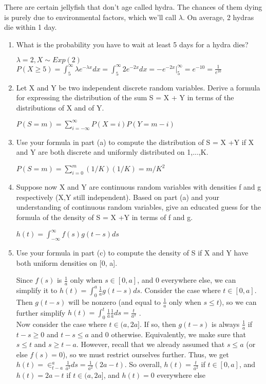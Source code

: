 \question There are certain jellyfish that don’t age called hydra. The 
chances of them dying is purely due to environmental factors, which 
we’ll call $\lambda$. On average, 2 hydras die within 1 day.
\begin{enumerate}[label=(\alph*)]
\item What is the probability you have to wait at least 5 days for a 
hydra dies?
\begin{solution}[2.5cm]
$\lambda = 2, X \sim Exp(2)$ \\
$P(X\geq 5) = \int_5^\infty \lambda e^{-\lambda x} dx = \int_5^\infty 
2e^{-2x} dx = -e^{-2x} |_5^\infty = e^{-10} = \frac{1}{e^{10}}$
\end{solution}

\item
Let X and Y be two independent discrete random variables. Derive a 
formula for expressing the distribution of the sum S = X + Y in terms 
of the distributions of X and of Y.
\begin{solution}[2.5cm]
$P(S=m) = \sum_{i=-\infty}^\infty P(X = i)P(Y=m-i)$
\end{solution}
\item
Use your formula in part (a) to compute the distribution of S = X +Y 
if X and Y are both discrete and uniformly distributed on {1,...,K}.
\begin{solution}[2.5cm]
$P(S=m) = \sum_{i=0}^m (1/K)(1/K) = m/K^2$
\end{solution}
\item  Suppose now X and Y are continuous random variables with 
densities f and g respectively (X,Y still independent). Based on part 
(a) and your understanding of continuous random variables, give an 
educated guess for the formula of the density of S = X +Y in terms of f and g.
\begin{solution}[2cm]
$ h(t) = \int_{-\infty}^\infty f(s) g(t-s) ds $
\end{solution}

\item Use your formula in part (c) to compute the density of S if X 
and Y have both uniform densities on [0, a].
\begin{solution}
Since $f(s)$ is $\frac{1}{a}$ only when $s \in [0, a]$, and 0 everywhere 
else, we can simplify it to $h(t) = \int_0^a \frac{1}{a} g(t-s) ds$. 
Consider the case where $t \in [0,a]$. Then $g(t-s)$ will be nonzero 
(and equal to $\frac{1}{a}$ only when $s \leq t$), so we can further 
simplify $h(t) = \int_0^t \frac{1}{a} \frac{1}{a} ds = \frac{t}{a^2}$ . \\
Now consider the case where $t \in (a, 2a]$. If so, then $g(t-s)$ is 
always $\frac{1}{a}$ if $t-s\geq 0$ and $t-s\leq a$ and 0 otherwise. 
Equivalently, we make sure that $s\leq t$ and $s \geq t-a$. However, 
recall that we already assumed that $s \leq a$ (or else $f(s) = 0$), 
so we must restrict ourselves further. Thus, we get $h(t) = \in_{t-a}^a 
\frac{1}{a^2} ds = \frac{1}{a^2} (2a-t)$. So overall, $h(t) = 
\frac{t}{a^2}$ if $t \in [0, a]$, and $h(t) = 2a-t$ if $t \in (a, 2a]$, 
and $h(t) = 0$ everywhere else

\end{solution}

\end{enumerate}